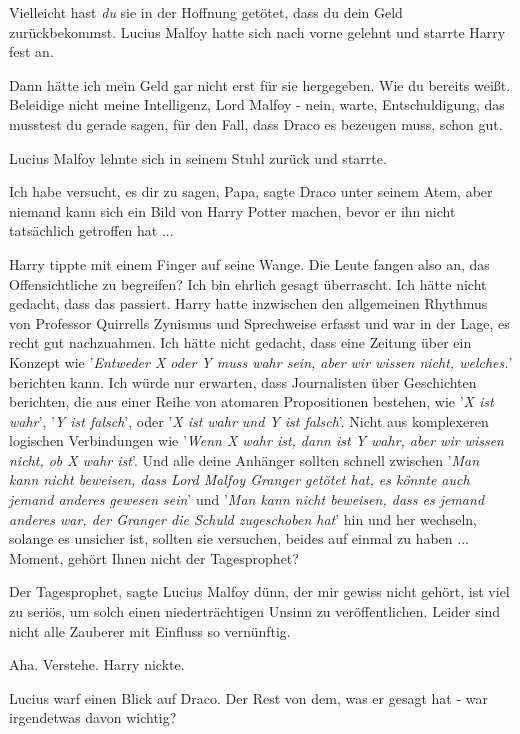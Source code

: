 \glqq{}Vielleicht hast \emph{du} sie in der Hoffnung getötet, dass du dein Geld
zurückbekommst.\grqq{} Lucius Malfoy hatte sich nach vorne gelehnt und starrte
Harry fest an.

\glqq{}Dann hätte ich mein Geld gar nicht erst für sie hergegeben. Wie du bereits
weißt. Beleidige nicht meine Intelligenz, Lord Malfoy - nein, warte,
Entschuldigung, das musstest du gerade sagen, für den Fall, dass Draco es
bezeugen muss, schon gut.\grqq{}

Lucius Malfoy lehnte sich in seinem Stuhl zurück und starrte.

\glqq{}Ich habe versucht, es dir zu sagen, Papa\grqq{}, sagte Draco unter seinem
Atem, \glqq{}aber niemand kann sich ein Bild von Harry Potter machen, bevor er
ihn nicht tatsächlich getroffen hat ...\grqq{}

Harry tippte mit einem Finger auf seine Wange. \glqq{}Die Leute fangen also an,
das Offensichtliche zu begreifen? Ich bin ehrlich gesagt überrascht. Ich hätte
nicht gedacht, dass das passiert.\grqq{} Harry hatte inzwischen den allgemeinen
Rhythmus von Professor Quirrells Zynismus und Sprechweise erfasst und war in der
Lage, es recht gut nachzuahmen. \glqq{}Ich hätte nicht gedacht, dass eine Zeitung
über ein Konzept wie '\emph{Entweder X oder Y muss wahr sein, aber wir wissen
nicht, welches.}' berichten kann. Ich würde nur erwarten, dass Journalisten über
Geschichten berichten, die aus einer Reihe von atomaren Propositionen bestehen,
wie '\emph{X ist wahr}', '\emph{Y ist falsch}', oder '\emph{X ist wahr und Y ist
falsch}'. Nicht aus komplexeren logischen Verbindungen wie '\emph{Wenn X wahr
ist, dann ist Y wahr, aber wir wissen nicht, ob X wahr ist}'. Und alle deine
Anhänger sollten schnell zwischen '\emph{Man kann nicht beweisen, dass Lord
Malfoy Granger getötet hat, es könnte auch jemand anderes gewesen sein}' und
'\emph{Man kann nicht beweisen, dass es jemand anderes war, der Granger die
Schuld zugeschoben hat}' hin und her wechseln, solange es unsicher ist, sollten
sie versuchen, beides auf einmal zu haben ... Moment, gehört Ihnen nicht der
Tagesprophet?\grqq{}

\glqq{}Der Tagesprophet\grqq{}, sagte Lucius Malfoy dünn, \glqq{}der mir gewiss
nicht gehört, ist viel zu seriös, um solch einen niederträchtigen Unsinn zu
veröffentlichen. Leider sind nicht alle Zauberer mit Einfluss so
vernünftig.\grqq{}

\glqq{}Aha. Verstehe.\grqq{} Harry nickte.

Lucius warf einen Blick auf Draco. \glqq{}Der Rest von dem, was er gesagt hat -
war irgendetwas davon wichtig?\grqq{}

